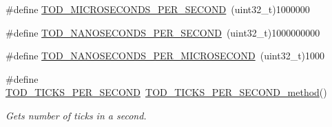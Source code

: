 \begin{DoxyCompactItemize}
\item 
\#define \mbox{\hyperlink{group__RTEMSScoreTOD_ga73e4390e03bc6841bf67a6a6b2af50fb}{T\+O\+D\+\_\+\+M\+I\+C\+R\+O\+S\+E\+C\+O\+N\+D\+S\+\_\+\+P\+E\+R\+\_\+\+S\+E\+C\+O\+ND}}~(uint32\+\_\+t)1000000
\item 
\#define \mbox{\hyperlink{group__RTEMSScoreTOD_gaf651497d56452a096aa08f62e2c5e332}{T\+O\+D\+\_\+\+N\+A\+N\+O\+S\+E\+C\+O\+N\+D\+S\+\_\+\+P\+E\+R\+\_\+\+S\+E\+C\+O\+ND}}~(uint32\+\_\+t)1000000000
\item 
\#define \mbox{\hyperlink{group__RTEMSScoreTOD_gaab190efd7d5cb11ee85d4fcd4a528ddf}{T\+O\+D\+\_\+\+N\+A\+N\+O\+S\+E\+C\+O\+N\+D\+S\+\_\+\+P\+E\+R\+\_\+\+M\+I\+C\+R\+O\+S\+E\+C\+O\+ND}}~(uint32\+\_\+t)1000
\item 
\#define \mbox{\hyperlink{group__RTEMSScoreTOD_ga00b749daf216fa5d13cc6ed43af0627a}{T\+O\+D\+\_\+\+T\+I\+C\+K\+S\+\_\+\+P\+E\+R\+\_\+\+S\+E\+C\+O\+ND}}~\mbox{\hyperlink{group__RTEMSScoreTOD_ga8bcb0f19ff76e742900cc90ebe6a49bd}{T\+O\+D\+\_\+\+T\+I\+C\+K\+S\+\_\+\+P\+E\+R\+\_\+\+S\+E\+C\+O\+N\+D\+\_\+method}}()
\begin{DoxyCompactList}\small\item\em Gets number of ticks in a second. \end{DoxyCompactList}\end{DoxyCompactItemize}
